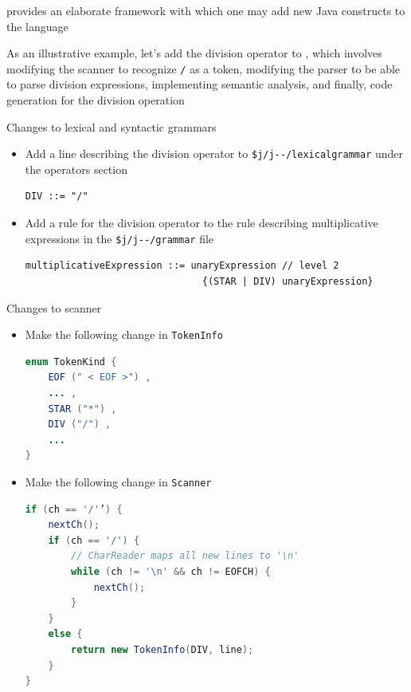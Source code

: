 \documentclass[8pt,a4paper,compress]{beamer}
\begin{document}
\begin{frame}[fragile]
\pause

\jmm provides an elaborate framework with which one may add new Java constructs to the \jmm language

\pause
\bigskip

As an illustrative example, let's add the division operator to \jmm, which involves modifying the scanner to recognize \lstinline{/} as a token, modifying the parser to be able to parse division expressions, implementing semantic analysis, and finally, code generation for the division operation

\pause
\bigskip

Changes to lexical and syntactic grammars
\begin{itemize}
\item Add a line describing the division operator to \lstinline{$j/j--/lexicalgrammar} under the operators section

\begin{lstlisting}[language={}]
DIV ::= "/"
\end{lstlisting}

\item Add a rule for the division operator to the rule describing multiplicative expressions in the \lstinline{$j/j--/grammar} file

\begin{lstlisting}[language={}]
multiplicativeExpression ::= unaryExpression // level 2
                               {(STAR | DIV) unaryExpression}
\end{lstlisting}
\end{itemize}
\end{frame}

\begin{frame}[fragile]
\pause

Changes to scanner
\begin{itemize}
\item Make the following change in \lstinline{TokenInfo}

\begin{lstlisting}[language=Java]
enum TokenKind {
    EOF (" < EOF >") ,
    ... ,
    STAR ("*") ,
    DIV ("/") ,
    ...
}
\end{lstlisting}

\item Make the following change in \lstinline{Scanner}

\begin{lstlisting}[language=Java]
if (ch == '/'’) {
    nextCh();
    if (ch == '/') {
        // CharReader maps all new lines to '\n'
        while (ch != '\n' && ch != EOFCH) {
            nextCh();
        }
    }
    else {
        return new TokenInfo(DIV, line);
    }
}
\end{lstlisting}
\end{itemize}
\end{frame}
\end{document}
